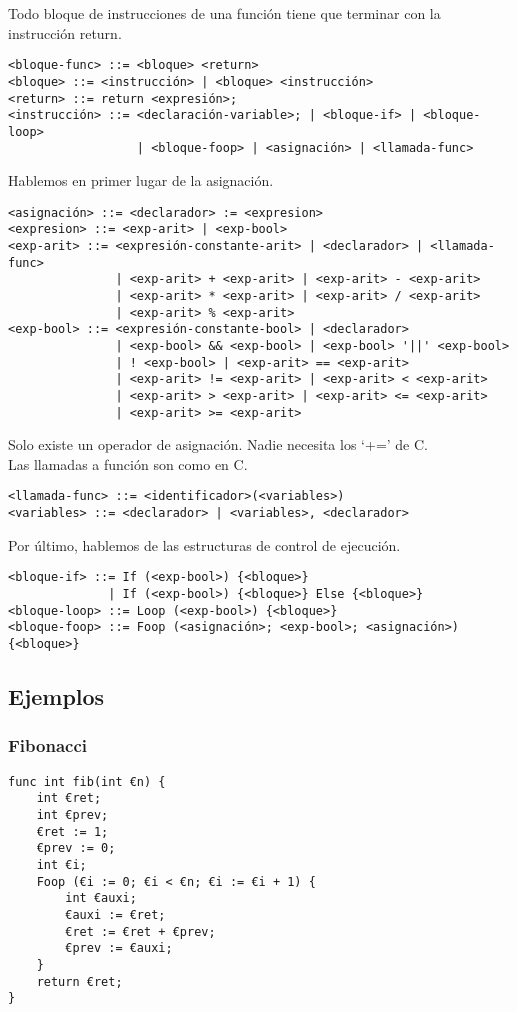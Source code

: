 \documentclass[spanish, a4paper, 12pt] {article}
\begin{document}
Todo bloque de instrucciones de una función tiene que terminar con la instrucción return.
\begin{verbatim}
<bloque-func> ::= <bloque> <return>
<bloque> ::= <instrucción> | <bloque> <instrucción>
<return> ::= return <expresión>;
<instrucción> ::= <declaración-variable>; | <bloque-if> | <bloque-loop>
                  | <bloque-foop> | <asignación> | <llamada-func>
\end{verbatim}
Hablemos en primer lugar de la asignación.
\begin{verbatim}
<asignación> ::= <declarador> := <expresion>
<expresion> ::= <exp-arit> | <exp-bool>
<exp-arit> ::= <expresión-constante-arit> | <declarador> | <llamada-func>
               | <exp-arit> + <exp-arit> | <exp-arit> - <exp-arit>
               | <exp-arit> * <exp-arit> | <exp-arit> / <exp-arit>
               | <exp-arit> % <exp-arit>
<exp-bool> ::= <expresión-constante-bool> | <declarador>
               | <exp-bool> && <exp-bool> | <exp-bool> '||' <exp-bool>
               | ! <exp-bool> | <exp-arit> == <exp-arit>
               | <exp-arit> != <exp-arit> | <exp-arit> < <exp-arit>
               | <exp-arit> > <exp-arit> | <exp-arit> <= <exp-arit>
               | <exp-arit> >= <exp-arit>
\end{verbatim}
Solo existe un operador de asignación. Nadie necesita los `+=' de C.\\

Las llamadas a función son como en C.
\begin{verbatim}
<llamada-func> ::= <identificador>(<variables>)
<variables> ::= <declarador> | <variables>, <declarador>
\end{verbatim}
Por último, hablemos de las estructuras de control de ejecución.
\begin{verbatim}
<bloque-if> ::= If (<exp-bool>) {<bloque>}
              | If (<exp-bool>) {<bloque>} Else {<bloque>}
<bloque-loop> ::= Loop (<exp-bool>) {<bloque>}
<bloque-foop> ::= Foop (<asignación>; <exp-bool>; <asignación>) {<bloque>}
\end{verbatim}
\subsection*{Ejemplos}
\subsubsection*{Fibonacci}
\begin{verbatim}
func int fib(int €n) {
    int €ret;
    int €prev;
    €ret := 1;
    €prev := 0;
    int €i;
    Foop (€i := 0; €i < €n; €i := €i + 1) {
        int €auxi;
        €auxi := €ret;
        €ret := €ret + €prev;
        €prev := €auxi;
    }
    return €ret;
}
\end{verbatim}
\end{document}
